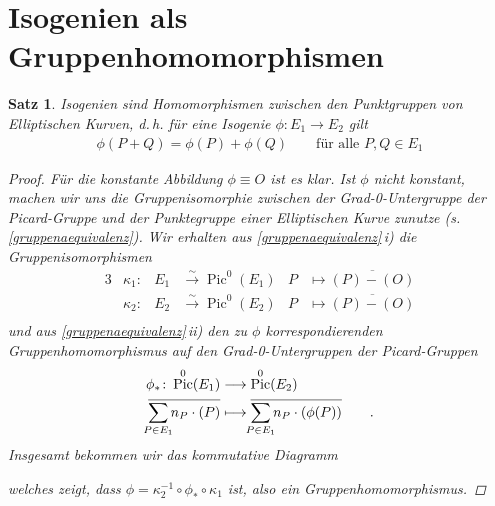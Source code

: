 \documentclass[english, german, parskip=half]{scrartcl}
\newtheorem{Satz}{Satz}[section]
\theoremstyle{definition}
\theoremstyle{remark}
\newcommand*{\longto}{\longrightarrow}
\DeclareMathOperator{\Pic}{Pic} %
\begin{document}

\section{Isogenien als Gruppenhomomorphismen}
\begin{Satz}\label{isogenienhoms}
  Isogenien sind Homomorphismen zwischen den Punktgruppen von
  Elliptischen Kurven, d.\,h. für eine Isogenie $\phi\colon E_1\to
  E_2$ gilt
  \begin{gather*}
    \phi(P+Q) = \phi(P) + \phi(Q)
    \qquad \text{für alle } P,Q\in E_1
  \end{gather*}
\begin{proof}
  Für die konstante Abbildung $\phi\equiv O$ ist es klar.
  Ist $\phi$ nicht konstant, machen wir uns die Gruppenisomorphie
  zwischen der Grad-0-Untergruppe der Picard-Gruppe und der
  Punktegruppe einer Elliptischen Kurve zunutze
  (s.\,\autoref{gruppenaequivalenz}).
  Wir erhalten 
  aus \autoref{gruppenaequivalenz}\,i) die Gruppenisomorphismen 
  \begin{alignat*}{3}
    &\kappa_1\colon&
    E_1&\overset\sim\longto \Pic^0(E_1)
    &P &\longmapsto \overline{(P)-(O)}\\
    &\kappa_2\colon&
    E_2&\overset\sim\longto \Pic^0(E_2)
    &P &\longmapsto \overline{(P)-(O)}\\
  \end{alignat*}
  und aus \autoref{gruppenaequivalenz}\,ii) den zu $\phi$
  korrespondierenden Gruppenhomomorphismus auf den Grad-0-Untergruppen
  der Picard-Gruppen
  \begin{align*}
    \phi_*\colon \Pic^0(E_1) 
    &\longto \Pic^0(E_2)\\
    \overline{\sum_{\mathclap{P\in E_1}}n_P\cdot(P)}
    &\longmapsto 
      \overline{\sum_{\mathclap{P\in E_1}}n_P\cdot(\phi(P))}
      \qquad .
  \end{align*}
  Insgesamt bekommen wir das kommutative Diagramm
  \begin{center}
  \end{center}
  welches zeigt, dass $\phi=\kappa_2^{-1}\circ\phi_*\circ\kappa_1$
  ist, also ein Gruppenhomomorphismus.
\end{proof}
\end{Satz}
\end{document}
